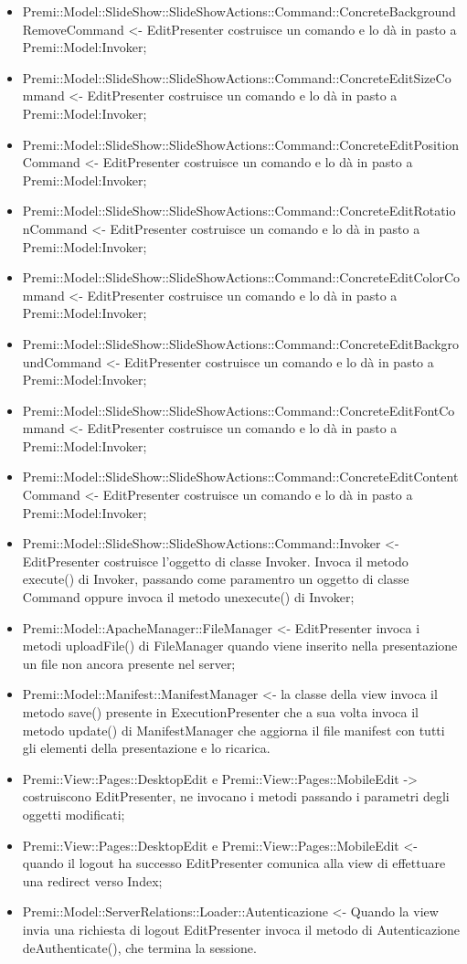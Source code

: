 {{\begin{itemize}
			\item Premi::Model::SlideShow::SlideShowActions::Command::ConcreteBackgroundRemoveCommand <- EditPresenter costruisce un comando e lo dà in pasto a Premi::Model:Invoker;
			\item Premi::Model::SlideShow::SlideShowActions::Command::ConcreteEditSizeCommand <- EditPresenter costruisce un comando e lo dà in pasto a Premi::Model:Invoker;
			\item Premi::Model::SlideShow::SlideShowActions::Command::ConcreteEditPositionCommand <- EditPresenter costruisce un comando e lo dà in pasto a Premi::Model:Invoker;
			\item Premi::Model::SlideShow::SlideShowActions::Command::ConcreteEditRotationCommand <- EditPresenter costruisce un comando e lo dà in pasto a Premi::Model:Invoker;
			\item Premi::Model::SlideShow::SlideShowActions::Command::ConcreteEditColorCommand <- EditPresenter costruisce un comando e lo dà in pasto a Premi::Model:Invoker;
			\item Premi::Model::SlideShow::SlideShowActions::Command::ConcreteEditBackgroundCommand <- EditPresenter costruisce un comando e lo dà in pasto a Premi::Model:Invoker;
			\item Premi::Model::SlideShow::SlideShowActions::Command::ConcreteEditFontCommand <- EditPresenter costruisce un comando e lo dà in pasto a Premi::Model:Invoker;
			\item Premi::Model::SlideShow::SlideShowActions::Command::ConcreteEditContentCommand <- EditPresenter costruisce un comando e lo dà in pasto a Premi::Model:Invoker;
			\item Premi::Model::SlideShow::SlideShowActions::Command::Invoker <- EditPresenter costruisce l’oggetto di classe Invoker. Invoca il metodo execute() di Invoker, passando come paramentro un oggetto di classe Command oppure invoca il metodo unexecute() di Invoker;
			\item Premi::Model::ApacheManager::FileManager <- EditPresenter invoca i metodi uploadFile() di FileManager quando viene inserito nella presentazione un file non ancora presente nel server;
			\item Premi::Model::Manifest::ManifestManager <- la classe della view invoca il metodo save() presente in  ExecutionPresenter che a sua volta invoca il metodo update() di ManifestManager che aggiorna il file manifest con tutti gli elementi della presentazione e lo ricarica.  												
			\item Premi::View::Pages::DesktopEdit e Premi::View::Pages::MobileEdit -> costruiscono EditPresenter, ne invocano i metodi passando i parametri degli oggetti modificati;
			\item Premi::View::Pages::DesktopEdit e Premi::View::Pages::MobileEdit <- quando il logout ha successo EditPresenter comunica alla view di effettuare una redirect verso Index;
			\item Premi::Model::ServerRelations::Loader::Autenticazione <- Quando la view invia una richiesta di logout EditPresenter invoca il metodo di Autenticazione deAuthenticate(), che termina la sessione.
			

\end{itemize}}}
